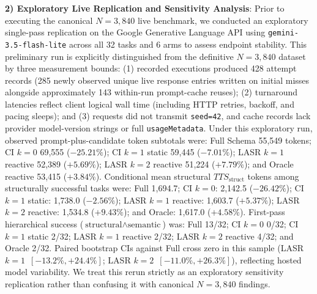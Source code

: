 \noindent\textbf{2) Exploratory Live Replication and Sensitivity Analysis}: Prior to executing the canonical $N=3,840$ live benchmark, we conducted an exploratory single-pass replication on the Google Generative Language API using \texttt{gemini-3.5-flash-lite} across all 32 tasks and 6 arms to assess endpoint stability. This preliminary run is explicitly distinguished from the definitive $N=3,840$ dataset by three measurement bounds: (1) recorded executions produced 428 attempt records (285 newly observed unique live response entries written on initial misses alongside approximately 143 within-run prompt-cache reuses); (2) turnaround latencies reflect client logical wall time (including HTTP retries, backoff, and pacing sleeps); and (3) requests did not transmit \texttt{seed=42}, and cache records lack provider model-version strings or full \texttt{usageMetadata}. Under this exploratory run, observed prompt-plus-candidate token subtotals were: Full Schema 55,549 tokens; CI $k=0$ 69,555 ($-25.21\%$); CI $k=1$ static 59,445 ($-7.01\%$); LASR $k=1$ reactive 52,389 ($+5.69\%$); LASR $k=2$ reactive 51,224 ($+7.79\%$); and Oracle reactive 53,415 ($+3.84\%$). Conditional mean structural $TTS_{\text{struct}}$ tokens among structurally successful tasks were: Full 1,694.7; CI $k=0$: 2,142.5 ($-26.42\%$); CI $k=1$ static: 1,738.0 ($-2.56\%$); LASR $k=1$ reactive: 1,603.7 ($+5.37\%$); LASR $k=2$ reactive: 1,534.8 ($+9.43\%$); and Oracle: 1,617.0 ($+4.58\%$). First-pass hierarchical success ($\text{structural} \land \text{semantic}$) was: Full 13/32; CI $k=0$ 0/32; CI $k=1$ static 2/32; LASR $k=1$ reactive 2/32; LASR $k=2$ reactive 4/32; and Oracle 2/32. Paired bootstrap CIs against Full cross zero in this sample (LASR $k=1$~$[-13.2\%, +24.4\%]$; LASR $k=2$~$[-11.0\%, +26.3\%]$), reflecting hosted model variability. We treat this rerun strictly as an exploratory sensitivity replication rather than confusing it with canonical $N=3,840$ findings.

